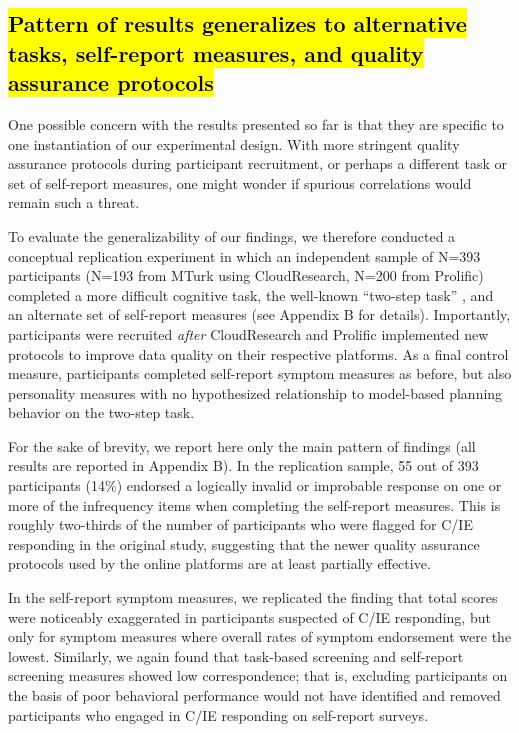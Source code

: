 \documentclass[a4paper,notitlepage,12pt]{article}
\begin{document}
\begin{refsection}[main]
\subsection{\texorpdfstring{\hl{Pattern of results generalizes to alternative tasks, self-report measures, and quality assurance protocols}}{}}

One possible concern with the results presented so far is that they are specific to one instantiation of our experimental design. With more stringent quality assurance protocols during participant recruitment, or perhaps a different task or set of self-report measures, one might wonder if spurious correlations would remain such a threat.

To evaluate the generalizability of our findings, we therefore conducted a conceptual replication experiment in which an independent sample of N=393 participants (N=193 from MTurk using CloudResearch, N=200 from Prolific) completed a more difficult cognitive task, the well-known ``two-step task'' \cite{daw2011model}, and an alternate set of self-report measures (see Appendix B for details). Importantly, participants were recruited \textit{after} CloudResearch and Prolific implemented new protocols to improve data quality on their respective platforms. As a final control measure, participants completed self-report symptom measures as before, but also personality measures with no hypothesized relationship to model-based planning behavior on the two-step task. 

For the sake of brevity, we report here only the main pattern of findings (all results are reported in Appendix B). In the replication sample, 55 out of 393 participants (14\%) endorsed a logically invalid or improbable response on one or more of the infrequency items when completing the self-report measures. This is roughly two-thirds of the number of participants who were flagged for C/IE responding in the original study, suggesting that the newer quality assurance protocols used by the online platforms are at least partially effective. 

In the self-report symptom measures, we replicated the finding that total scores were noticeably exaggerated in participants suspected of C/IE responding, but only for symptom measures where overall rates of symptom endorsement were the lowest. Similarly, we again found that task-based screening and self-report screening measures showed low correspondence; that is, excluding participants on the basis of poor behavioral performance would not have identified and removed participants who engaged in C/IE responding on self-report surveys. 


\end{refsection}
\end{document}
